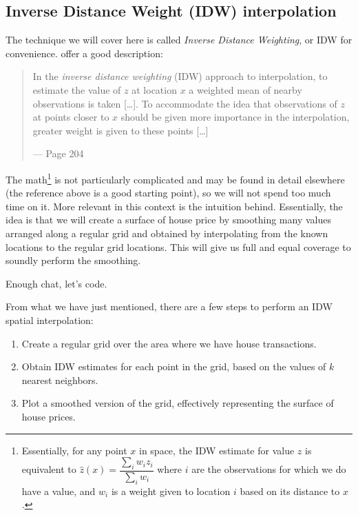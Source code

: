 \documentclass[]{book}
\providecommand{\tightlist}{%
  \setlength{\itemsep}{0pt}\setlength{\parskip}{0pt}}
\let\rmarkdownfootnote\footnote%
\def\footnote{\protect\rmarkdownfootnote}
\begin{document}
\hypertarget{inverse-distance-weight-idw-interpolation}{%
\subsection{Inverse Distance Weight (IDW) interpolation}\label{inverse-distance-weight-idw-interpolation}}

The technique we will cover here is called \emph{Inverse Distance Weighting}, or IDW for convenience. \citet{comber2015} offer a good description:

\begin{quote}
In the \emph{inverse distance weighting} (IDW) approach to interpolation, to estimate the value of \(z\) at location \(x\) a weighted mean of nearby observations is taken {[}\ldots{]}. To accommodate the idea that observations of \(z\) at points closer to \(x\) should be given more importance in the interpolation, greater weight is given to these points {[}\ldots{]}

--- Page 204
\end{quote}

The math\footnote{Essentially, for any point \(x\) in space, the IDW estimate for value \(z\) is equivalent to \(\hat{z} (x) = \dfrac{\sum_i w_i z_i}{\sum_i w_i}\) where \(i\) are the observations for which we do have a value, and \(w_i\) is a weight given to location \(i\) based on its distance to \(x\).} is not particularly complicated and may be found in detail elsewhere (the reference above is a good starting point), so we will not spend too much time on it. More relevant in this context is the intuition behind. Essentially, the idea is that we will create a surface of house price by smoothing many values arranged along a regular grid and obtained by interpolating from the known locations to the regular grid locations. This will give us full and equal coverage to soundly perform the smoothing.

Enough chat, let's code.

From what we have just mentioned, there are a few steps to perform an IDW spatial interpolation:

\begin{enumerate}
\def\labelenumi{\arabic{enumi}.}
\tightlist
\item
  Create a regular grid over the area where we have house transactions.
\item
  Obtain IDW estimates for each point in the grid, based on the values of \(k\) nearest neighbors.
\item
  Plot a smoothed version of the grid, effectively representing the surface of house prices.
\end{enumerate}
\end{document}
